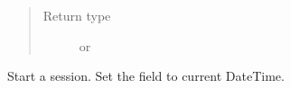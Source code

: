 \documentclass[letterpaper,10pt,english]{sphinxmanual}
\begin{document}
\begin{fulllineitems}
\begin{fulllineitems}
\begin{quote}
\begin{description}
\item[{Return type}] \leavevmode
{} or 

\end{description}\end{quote}

\end{fulllineitems}


\begin{fulllineitems}
\label{models:models.Session.start}
Start a session.
Set the  field to current DateTime.

\end{fulllineitems}


\end{fulllineitems}

\end{document}
